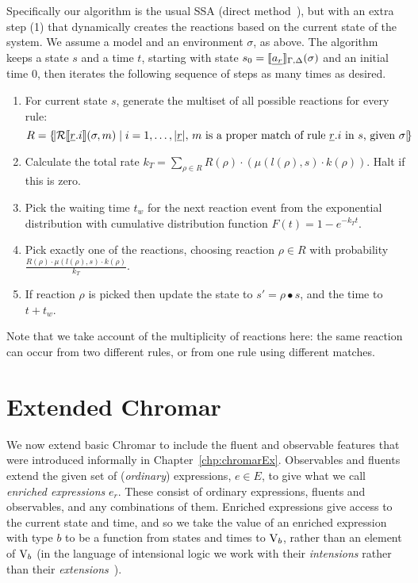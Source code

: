 Specifically our algorithm is the usual SSA (direct
method~\cite{gillespie1977exact}), but with an extra step (1) that dynamically
creates the reactions based on the current state of the system. We assume a
model and an environment $\sigma$, as above. The algorithm keeps a state $s$ and a
time $t$, starting with state $s_0 = \llbracket \underline{a_r} \rrbracket_{\Gamma,\Delta}(\sigma)$ and an initial time
$0$, then iterates the following sequence of steps as many times as desired.
\begin{enumerate}
\item For current state $s$, generate the multiset of all possible reactions for
  every rule:
$$R  = \{\!|  \mathcal{R}\llbracket \underline{r}.i \rrbracket(\sigma, m) \; | \; i = 1,\ldots, |\underline{r}|, \, m \mbox{ is a proper match of rule $\underline{r}.i$ in $s$, given $\sigma$} |\!\}$$ 
\item Calculate the total rate
  $k_T = \sum_{\rho \in R} R(\rho)\cdot (\mu(l(\rho), s)\cdot k(\rho))$. Halt if this is zero.
\item Pick the waiting time $t_w$ for the next reaction event from the
  exponential distribution with cumulative distribution function
  $F(t) = 1- e^{-k_T t}$.
\item Pick exactly one of the reactions, choosing reaction $\rho \in R$ with
  probability $\frac{R(\rho)\cdot \mu(l(\rho), s) \cdot k(\rho)}{k_T}$.
\item If reaction $\rho$ is picked then update the state to
  $s' = \rho \bullet s$, and the time to $t + t_w$.
\end{enumerate}

Note that we take account of the multiplicity of reactions here: the same
reaction can occur from two different rules, or from one rule using different
matches.

\section{Extended Chromar} 
\label{sec:extChromar} 
We now extend basic Chromar to include the fluent and observable features that
were introduced informally in Chapter~\ref{chp:chromarEx}. Observables and
fluents extend the given set of (\emph{ordinary}) expressions, $e \in E$, to
give what we call \emph{enriched expressions} $e_r$. These consist of ordinary
expressions, fluents and observables, and any combinations of them. Enriched
expressions give access to the current state and time, and so we take the value
of an enriched expression with type $b$ to be a function from states and times
to $\mathrm{V}_b$, rather than an element of $\mathrm{V}_b$ (in the language of intensional
logic we work with their \emph{intensions} rather than their
\emph{extensions}~\cite{Stan,Fit}).

